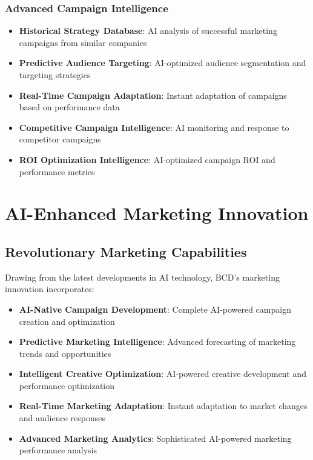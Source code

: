 \documentclass[12pt,a4paper]{book}
\begin{document}
\subsubsection{Advanced Campaign Intelligence}

\begin{itemize}
    \item \textbf{Historical Strategy Database}: AI analysis of successful marketing campaigns from similar companies
    \item \textbf{Predictive Audience Targeting}: AI-optimized audience segmentation and targeting strategies
    \item \textbf{Real-Time Campaign Adaptation}: Instant adaptation of campaigns based on performance data
    \item \textbf{Competitive Campaign Intelligence}: AI monitoring and response to competitor campaigns
    \item \textbf{ROI Optimization Intelligence}: AI-optimized campaign ROI and performance metrics
\end{itemize}

\section{AI-Enhanced Marketing Innovation}

\subsection{Revolutionary Marketing Capabilities}

Drawing from the latest developments in AI technology, BCD's marketing innovation incorporates:

\begin{itemize}
    \item \textbf{AI-Native Campaign Development}: Complete AI-powered campaign creation and optimization
    \item \textbf{Predictive Marketing Intelligence}: Advanced forecasting of marketing trends and opportunities
    \item \textbf{Intelligent Creative Optimization}: AI-powered creative development and performance optimization
    \item \textbf{Real-Time Marketing Adaptation}: Instant adaptation to market changes and audience responses
    \item \textbf{Advanced Marketing Analytics}: Sophisticated AI-powered marketing performance analysis
\end{itemize}
\end{document}

